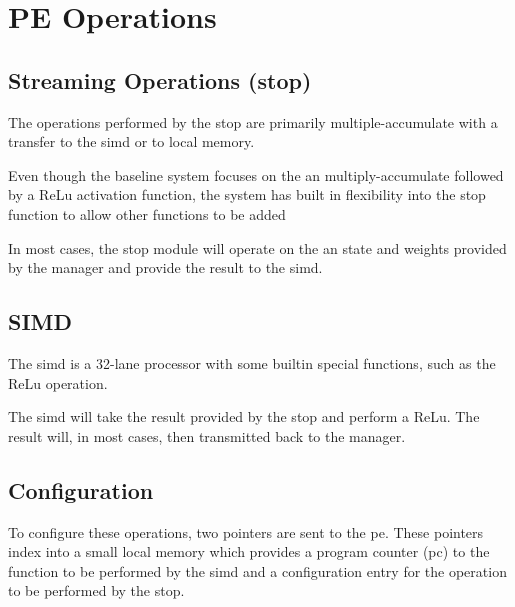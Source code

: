 \iffalse
\section{PE Operations}
\label{sec:PE Operations}

\subsection{Streaming Operations (\ac{stop})}
\label{sec:streamingOps}
The operations performed by the \ac{stop} are primarily multiple-accumulate with a transfer to the \ac{simd} or to local memory.

Even though the baseline system focuses on the \ac{an} multiply-accumulate followed by a ReLu activation function, the system has built in flexibility into the \ac{stop} function to allow other functions to be added

In most cases, the \ac{stop} module will operate on the \ac{an} state and weights provided by the manager and provide the result to the \ac{simd}.
\subsection{SIMD}
\label{sec:SIMD}

The \ac{simd} is a 32-lane processor with some builtin special functions, such as the ReLu operation.

The \ac{simd} will take the result provided by the \ac{stop} and perform a ReLu. The result will, in most cases, then transmitted back to the manager.

\subsection{Configuration}
\label{sec:peConfiguration}

To configure these operations, two pointers are sent to the \ac{pe}. These pointers index into a small local memory which provides a program counter (\ac{pc}) to the function to be performed by the \ac{simd} and a configuration entry for the operation to be performed by the \ac{stop}.

